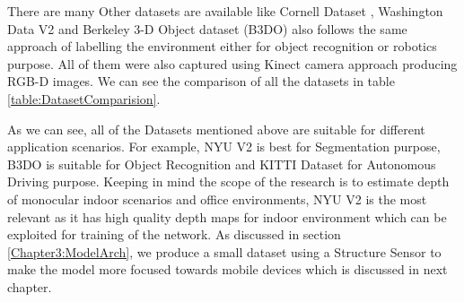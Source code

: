 There are many Other datasets are available like Cornell Dataset \cite{3Dscene} , Washington Data V2 \cite{Washington} and  Berkeley 3-D Object dataset (B3DO) \cite{Janoch:EECS-2012-85} also follows the same approach of labelling the environment either for object recognition or robotics purpose. All of them were also captured using Kinect camera approach producing RGB-D images. We can see the comparison of all the datasets in table \ref{table:DatasetComparision}.

As we can see, all of the Datasets mentioned above are suitable for different application scenarios. For example, NYU V2 \cite{Silberman:ECCV12} is best for Segmentation purpose, B3DO \cite{Janoch:EECS-2012-85} is suitable for Object Recognition and KITTI Dataset \cite{Geiger2013IJRR} for Autonomous Driving purpose. Keeping in mind the scope of the research is to estimate depth of monocular indoor scenarios and office environments, NYU V2 is the most relevant as it has high quality depth maps for indoor environment which can be exploited for training of the network. As discussed in section \ref{Chapter3:ModelArch}, we produce a small dataset using a Structure Sensor to make the model more focused towards mobile devices which is discussed in next chapter.









